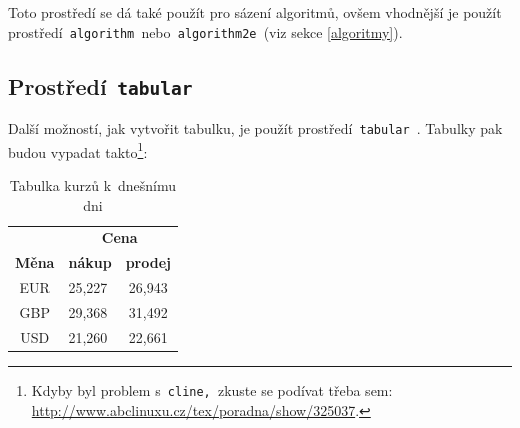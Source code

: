 \documentclass[a4paper, 11pt]{article}
\begin{document}
\noindent Toto prostředí se dá také použít pro sázení algoritmů, ovšem vhodnější je použít prostředí\texttt{ algorithm }nebo\texttt{ algorithm2e }(viz sekce \ref{algoritmy}). 

\subsection{Prostředí\texttt{ tabular }}

Další možností, jak vytvořit tabulku, je použít prostředí\texttt{ tabular }. Tabulky pak budou vypadat takto\footnote{Kdyby byl problem s\texttt{ cline, }zkuste se podívat  třeba sem: \url{http://www.abclinuxu.cz/tex/poradna/show/325037}.}:

\bigskip
\begin{table}[ht]
\centering
\begin{tabular}{|c|cc|}
\hline 
&\multicolumn{2}{c|}{\textbf{Cena}}\\ 
\cline{2-3} 
\textbf{Měna}&\textbf{nákup}& \textbf{prodej} \\ \hline
EUR&\multicolumn{1}{l|}{25,227}&26,943\\
GBP&\multicolumn{1}{l|}{29,368}&31,492\\
USD&\multicolumn{1}{l|}{21,260}&22,661\\ 
\hline

\end{tabular}
\caption{\label{tabulka 1}Tabulka kurzů k~dnešnímu dni} \label{tabulka 1}
\end{table}
\end{document}
